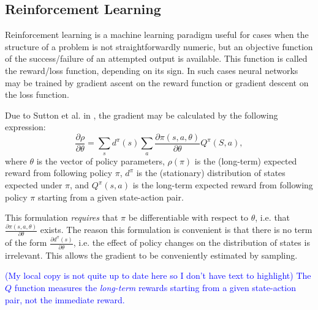\documentclass[12pt,twoside]{reedthesis}
\newcommand{\comment}[2]{\textbf{#1} \textcolor{blue}{#2}}
\begin{document}
    \subsection{Reinforcement Learning}
        Reinforcement learning is a machine learning paradigm useful for cases when the structure of a problem is not straightforwardly numeric, but an objective function of the success/failure of an attempted output is available. This function is called the reward/loss function, depending on its sign. In such cases neural networks may be trained by gradient ascent on the reward function or gradient descent on the loss function.

    Due to Sutton et al. in \cite{sutton1999policygradient}, the gradient may be calculated by the following expression:
    \[
        \frac{\partial \rho}{\partial \theta} = \sum_s d^\pi(s) \sum_a \frac{\partial \pi(s,a, \theta)}{\partial \theta}Q^\pi(S,a),
    \]
    where $\theta$ is the vector of policy parameters, $\rho(\pi)$ is the (long-term) expected reward from following policy $\pi$, $d^\pi$ is the (stationary) distribution of states expected under $\pi$, and $Q^\pi(s,a)$ is the long-term expected reward from following policy $\pi$ starting from a given state-action pair.

    This formulation \textit{requires} that $\pi$ be differentiable with respect to $\theta$, i.e. that $\frac{\partial \pi(s,a, \theta)}{\partial \theta}$ exists.
    The reason this formulation is convenient is that there is no term of the form $\frac{\partial d^\pi(s)}{\partial \theta}$, i.e. the effect of policy changes on the distribution of states is irrelevant.
    This allows the gradient to be conveniently estimated by sampling.  %

    \comment{}{(My local copy is not quite up to date here so I don't have text to highlight) The $Q$ function measures the \emph{long-term} rewards starting from a given state-action pair, not the immediate reward.}

\end{document}
